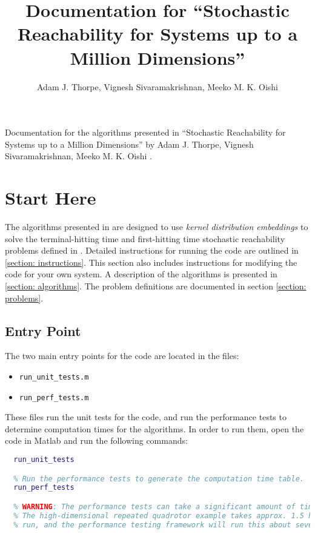 \documentclass[11pt]{article}
\title{%
  Documentation for
  ``Stochastic Reachability for Systems up to a Million Dimensions''
}
\author{Adam J. Thorpe, Vignesh Sivaramakrishnan, Meeko M. K. Oishi}
\begin{document}

\maketitle


Documentation for the algorithms presented in ``Stochastic Reachability for Systems up to a Million Dimensions'' by Adam J. Thorpe, Vignesh Sivaramakrishnan, Meeko M. K. Oishi \cite{thorpe2019stochastic}.

\tableofcontents

\newpage

\printnoidxglossary[type=symbols,style=long,title={List of Symbols}]

\newpage


\section{Start Here}

The algorithms presented in \cite{thorpe2019stochastic} are designed to use \emph{kernel distribution embeddings} \cite{grunewalder2012modelling} to solve the terminal-hitting time and first-hitting time stochastic reachability problems defined in \cite{abate2008probabilistic, summers2010verification}.
%
Detailed instructions for running the code are outlined in \ref{section: instructions}. This section also includes instructions for modifying the code for your own system.
A description of the algorithms is presented in \ref{section: algorithms}.
The problem definitions are documented in section \ref{section: problems}.

\subsection{Entry Point}

The two main entry points for the code are located in the files:
\begin{itemize}
  \item \verb|run_unit_tests.m|
  \item \verb|run_perf_tests.m|
\end{itemize}
These files run the unit tests for the code, and run the performance tests to determine computation times for the algorithms. In order to run them, open the code in Matlab and run the following commands:
\begin{lstlisting}[language=Matlab]
  % Run the unit tests for the code.
  run_unit_tests

  % Run the performance tests to generate the computation time table.
  run_perf_tests

  % WARNING: The performance tests can take a significant amount of time to run.
  % The high-dimensional repeated quadrotor example takes approx. 1.5 hours to
  % run, and the performance testing framework will run this about seven times.
\end{lstlisting}
\end{document}
